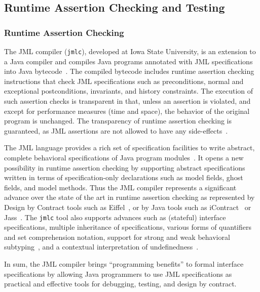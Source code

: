 \subsection{Runtime Assertion Checking and Testing}

\subsubsection{Runtime Assertion Checking}
\label{jmlc}

The JML compiler (\texttt{jmlc}), developed at Iowa State University,
is an extension to a Java compiler and compiles Java programs
annotated with JML specifications into Java
bytecode~\cite{Cheon03,Cheon-Leavens02b}.  The compiled bytecode includes
runtime assertion checking instructions that check JML specifications
such as preconditions, normal and exceptional postconditions,
invariants, and history constraints.  The execution of such assertion
checks is transparent in that, unless an assertion is violated, and
except for performance measures (time and space), the behavior of the
original program is unchanged.  The transparency of runtime assertion
checking is guaranteed, as JML assertions are not allowed to have any
side-effects~\cite{Leavens-etal03a}.

The JML language provides a rich set of specification facilities to
write abstract, complete behavioral specifications of Java program
modules~\cite{Leavens-etal03a}.  It opens a new possibility in runtime
assertion checking by supporting abstract specifications written in
terms of specification-only declarations such as model fields, ghost
fields, and model methods.  Thus the JML compiler represents a
significant advance over the state of the art in runtime assertion
checking as represented by Design by Contract tools such as
Eiffel~\cite{Meyer97}, or by Java tools such as
iContract~\cite{Kramer98} or Jass~\cite{Bartetzko-etal01}.  The
\texttt{jmlc} tool also supports advances such as (stateful) interface
specifications, multiple inheritance of specifications, various forms
of quantifiers and set comprehension notation, support for strong and
weak behavioral subtyping~\cite{Liskov-Wing94,Dhara-Leavens96}, and a
contextual interpretation of undefinedness~\cite{Leavens-etal03a}.

In sum, the JML compiler brings ``programming benefits'' to formal
interface specifications by allowing Java programmers to use JML
specifications as practical and effective tools for debugging,
testing, and design by contract.

